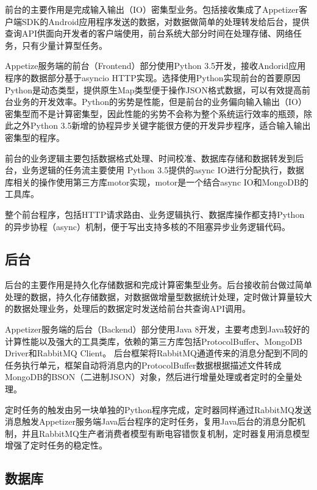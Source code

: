 前台的主要作用是完成输入输出（IO）密集型业务。包括接收集成了Appetizer客户端SDK的Android应用程序发送的数据，对数据做简单的处理转发给后台，提供查询API供面向开发者的客户端使用，前台系统大部分时间在处理存储、网络任务，只有少量计算型任务。

Appetize服务端的前台（Frontend）部分使用Python 3.5开发，接收Andorid应用程序的数据部分基于asyncio HTTP实现。选择使用Python实现前台的首要原因Python是动态类型，提供原生Map类型便于操作JSON格式数据，可以有效提高前台业务的开发效率。Python的劣势是性能，但是前台的业务偏向输入输出（IO）密集型而不是计算密集型，因此性能的劣势不会称为整个系统运行效率的瓶颈，除此之外Python 3.5新增的协程异步关键字能很方便的开发异步程序，适合输入输出密集型的程序。

前台的业务逻辑主要包括数据格式处理、时间校准、数据库存储和数据转发到后台，业务逻辑的任务流主要使用 Python 3.5提供的async IO进行分配执行，数据库相关的操作使用第三方库motor实现，motor是一个结合async IO和MongoDB的工具库。

整个前台程序，包括HTTP请求路由、业务逻辑执行、数据库操作都支持Python的异步协程（async）机制，便于写出支持多核的不阻塞异步业务逻辑代码。

\subsection{后台}
\label{subsec:serverBackend}

后台的主要作用是持久化存储数据和完成计算密集型业务。后台接收前台做过简单处理的数据，持久化存储数据，对数据做增量型数据统计处理，定时做计算量较大的数据处理业务，处理后的数据定时发送给前台共查询API调用。

Appetizer服务端的后台（Backend）部分使用Java 8开发，主要考虑到Java较好的计算性能以及强大的工具类库，依赖的第三方库包括ProtocolBuffer\parencite{protobuf}、MongoDB Driver和RabbitMQ Client。
后台框架将RabbitMQ通道传来的消息分配到不同的任务执行单元，框架自动将消息内的ProtocolBuffer数据根据描述文件转成MongoDB的BSON（二进制JSON）对象，然后进行增量处理或者定时的全量处理。

定时任务的触发由另一块单独的Python程序完成，定时器同样通过RabbitMQ发送消息触发Appetizer服务端Java后台程序的定时任务，复用Java后台的消息分配机制，并且RabbitMQ生产者消费者模型有断电容错恢复机制，定时器复用消息模型增强了定时任务的稳定性。

\subsection{数据库}
\label{subsec:database}


